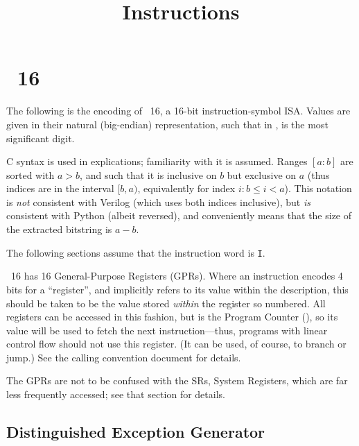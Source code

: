 

\title{Instructions}

\def\ins{{\tt I}}
\def\rg#1,#2.{$[#1:#2]$}
\def\ix#1{$[#1]$}

\chapter{\ass\ 16}

The following is the encoding of \ass\ 16, a 16-bit instruction-symbol ISA.
Values are given in their natural (big-endian) representation, such that in
,  is the most significant digit.

\bigskip
{
}
\bigskip

C syntax is used in explications; familiarity with it is assumed. Ranges
\rg a,b. are sorted with $a > b$, and such that it is inclusive on $b$ but
exclusive on $a$ (thus indices are in the interval $[b, a)$, equivalently for
index $i: b \le i < a$). This notation is {\it not} consistent with Verilog
(which uses both indices inclusive), but {\it is} consistent with Python
(albeit reversed), and conveniently means that the size of the extracted
bitstring is $a - b$.

The following sections assume that the instruction word is \ins.

\ass\ 16 has 16 General-Purpose Registers (GPRs). Where an instruction encodes
4 bits for a ``register'', and implicitly refers to its value within the
description, this should be taken to be the value stored {\it within} the
register so numbered. All registers can be accessed in this fashion, but
 is the Program Counter (), so its value will be used to fetch
the next instruction---thus, programs with linear control flow should not use
this register. (It can be used, of course, to branch or jump.) See the calling
convention document for details.

The GPRs are not to be confused with the SRs, System Registers, which are far
less frequently accessed; see that section for details.

\vfil \break

\section{Distinguished Exception Generator}

